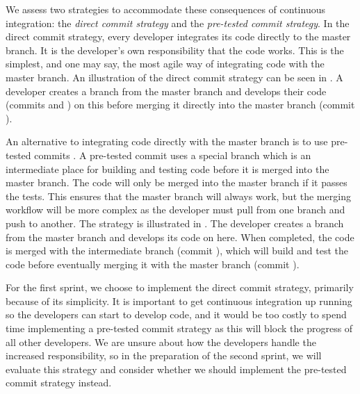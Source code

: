     We assess two strategies to accommodate these consequences of continuous integration: the \emph{direct commit strategy} and the \emph{pre-tested commit strategy}. In the direct commit strategy, every developer integrates its code directly to the master branch. It is the developer's own responsibility that the code works. This is the simplest, and one may say, the most agile way of integrating code with the master branch. An illustration of the direct commit strategy can be seen in . A developer creates a branch from the master branch and develops their code (commits  and ) on this before merging it directly into the master branch (commit ).

An alternative to integrating code directly with the master branch is to use pre-tested commits \parencite{fowlerPendingHead}. A pre-tested commit uses a special branch which is an intermediate place for building and testing code before it is merged into the master branch. The code will only be merged into the master branch if it passes the tests. This ensures that the master branch will always work, but the merging workflow will be more complex as the developer must pull from one branch and push to another. The strategy is illustrated in . The developer creates a branch from the master branch and develops its code on here. When completed, the code is merged with the intermediate branch (commit \emph{}), which will build and test the code before eventually merging it with the master branch (commit ).

For the first sprint, we choose to implement the direct commit strategy, primarily because of its simplicity. It is important to get continuous integration up running so the developers can start to develop code, and it would be too costly to spend time implementing a pre-tested commit strategy as this will block the progress of all other developers. We are unsure about how the developers handle the increased responsibility, so in the preparation of the second sprint, we will evaluate this strategy and consider whether we should implement the pre-tested commit strategy instead.

